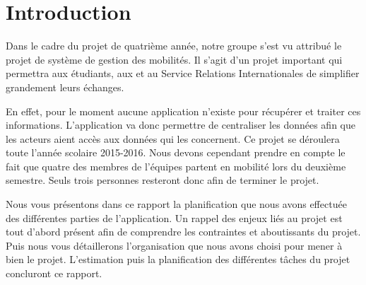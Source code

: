 \chapter*{Introduction}

Dans le cadre du projet de quatrième année, notre groupe s'est vu attribué le projet de système de gestion des mobilités. Il s'agit d'un projet important qui permettra aux étudiants, aux \ris et au Service Relations Internationales de simplifier grandement leurs échanges. 

En effet, pour le moment aucune application n'existe pour récupérer et traiter ces informations. L'application va donc permettre de centraliser les données afin que les acteurs aient accès aux données qui les concernent. Ce projet se déroulera toute l'année scolaire 2015-2016. Nous devons cependant prendre en compte le fait que quatre des membres de l'équipes partent en mobilité lors du deuxième semestre. Seuls trois personnes resteront donc afin de terminer le projet.

\bigbreak

Nous vous présentons dans ce rapport la planification que nous avons effectuée des différentes parties de l'application. Un rappel des enjeux liés au projet est tout d'abord présent afin de comprendre les contraintes et aboutissants du projet. Puis nous vous détaillerons l'organisation que nous avons choisi pour mener à bien le projet. L'estimation puis la planification des différentes tâches du projet concluront ce rapport.